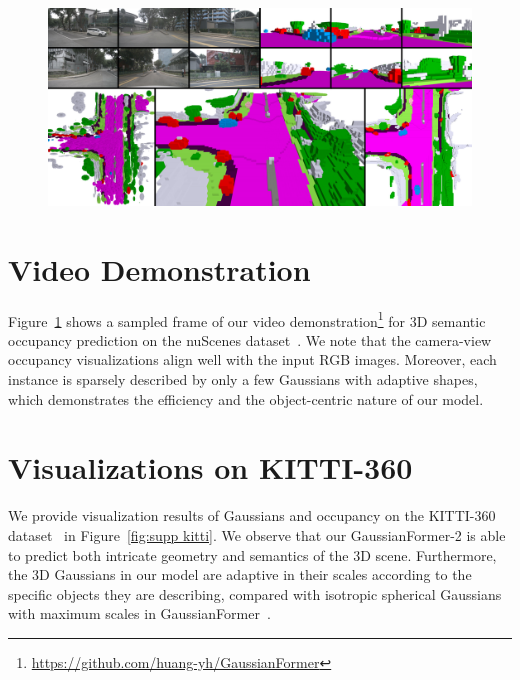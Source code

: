 
\appendix

\begin{figure}
    \centering
    \includegraphics[width=\linewidth]{figures/supp_teaser.pdf}
    \vspace{-7mm}
\label{fig: supp teaser}
\end{figure}%





\section{Video Demonstration}
\label{sec:video}
Figure~\ref{fig: supp teaser} shows a sampled frame of our video demonstration\footnote{\url{https://github.com/huang-yh/GaussianFormer}} for 3D semantic occupancy prediction on the nuScenes dataset~\cite{caesar2020nuscenes}.
We note that the camera-view occupancy visualizations align well with the input RGB images.
Moreover, each instance is sparsely described by only a few Gaussians with adaptive shapes, which demonstrates the efficiency and the object-centric nature of our model.


\section{Visualizations on KITTI-360}
\label{sec:vis kitti}
We provide visualization results of Gaussians and occupancy on the KITTI-360 dataset~\cite{Liao2022kitti360} in Figure~\ref{fig:supp kitti}.
We observe that our GaussianFormer-2 is able to predict both intricate geometry and semantics of the 3D scene.
Furthermore, the 3D Gaussians in our model are adaptive in their scales according to the specific objects they are describing, compared with isotropic spherical Gaussians with maximum scales in GaussianFormer~\cite{huang2024gaussian}.

